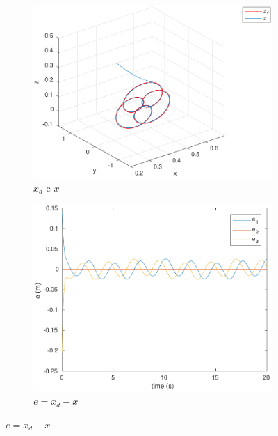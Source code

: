 \documentclass[a4paper,11pt]{article}
\theoremstyle{mytheor}
\begin{document}
\begin{figure}[!ht]
\centering
  \begin{minipage}{\linewidth}
  \centering
    \begin{subfigure}[b]{0.4\textwidth}
    		\includegraphics[width=1\textwidth]{figs/ex1_a_2_x.pdf}
    		\caption{$x_d$ e $x$}
    		\label{fig:ex1_a_2_x}
    \end{subfigure}
  \end{minipage}
  \begin{minipage}{\linewidth}
  \centering
    \begin{subfigure}[b]{0.4\textwidth}
    		\includegraphics[width=1\textwidth]{figs/ex1_a_2_e.pdf}
    		\caption{$e = x_d - x$}
    		\label{fig:ex1_a_2_e}

\end{subfigure}
\end{minipage}
\end{figure}
\end{document}
